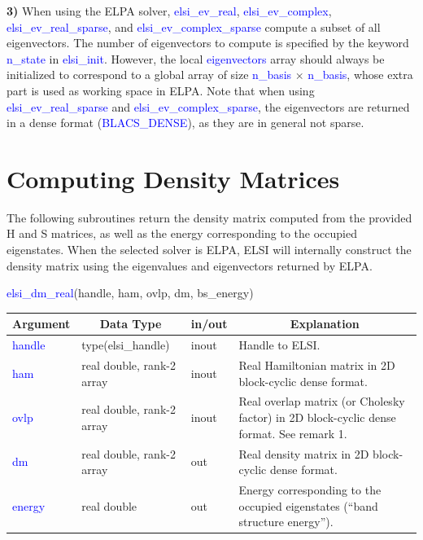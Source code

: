 \documentclass{report}
\begin{document}
\textbf{3)} When using the ELPA solver, \textcolor{blue}{elsi\_ev\_real}, \textcolor{blue}{elsi\_ev\_complex}, \textcolor{blue}{elsi\_ev\_real\_sparse}, and \textcolor{blue}{elsi\_ev\_complex\_sparse} compute a subset of all eigenvectors.  The number of eigenvectors to compute is specified by the keyword \textcolor{blue}{n\_state} in \textcolor{blue}{elsi\_init}.  However, the local \textcolor{blue}{eigenvectors} array should always be initialized to correspond to a global array of size \textcolor{blue}{n\_basis} $\times$ \textcolor{blue}{n\_basis}, whose extra part is used as working space in ELPA.  Note that when using \textcolor{blue}{elsi\_ev\_real\_sparse} and \textcolor{blue}{elsi\_ev\_complex\_sparse}, the eigenvectors are returned in a dense format (\textcolor{blue}{BLACS\_DENSE}), as they are in general not sparse.\\

\section{Computing Density Matrices}
\label{sec:dm}
The following subroutines return the density matrix computed from the provided H and S matrices, as well as the energy corresponding to the occupied eigenstates.  When the selected solver is ELPA, ELSI will internally construct the density matrix using the eigenvalues and eigenvectors returned by ELPA.\\

\begin{labeling}{\hspace{6cm}}
\item [\hspace{0.3cm} \textcolor{blue}{elsi\_dm\_real}(handle, ham, ovlp, dm, bs\_energy)]
\end{labeling}

\begin{tabular}[]{|p{20mm}|p{45mm}|p{15mm}|p{85mm}|}
\hline
\multicolumn{1}{|c|}{\textbf{Argument}} & \multicolumn{1}{c|}{\textbf{Data Type}} & \multicolumn{1}{c|}{\textbf{in/out}} & \multicolumn{1}{c|}{\textbf{Explanation}}\\
\hline
\textcolor{blue}{handle} & type(elsi\_handle)        & inout & Handle to ELSI.\\
\hline
\textcolor{blue}{ham}    & real double, rank-2 array & inout & Real Hamiltonian matrix in 2D block-cyclic dense format.\\
\hline
\textcolor{blue}{ovlp}   & real double, rank-2 array & inout & Real overlap matrix (or Cholesky factor) in 2D block-cyclic dense format.  See remark 1.\\
\hline
\textcolor{blue}{dm}     & real double, rank-2 array & out   & Real density matrix in 2D block-cyclic dense format.\\
\hline
\textcolor{blue}{energy} & real double               & out   & Energy corresponding to the occupied eigenstates (``band structure energy'').\\
\hline
\end{tabular}
\end{document}
